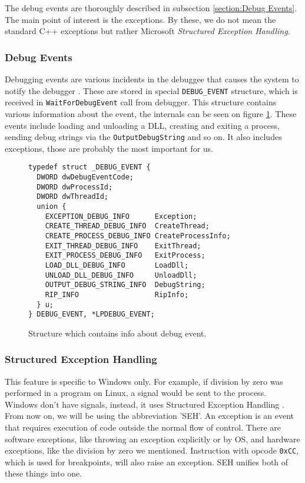 The debug events are thoroughly described in subsection \ref{section:Debug Events}. The main point of interest is the exceptions.
By these, we do not mean the standard C++ exceptions but rather Microsoft \textit{Structured Exception Handling}.

\subsubsection*{Debug Events}\label{section:Debug Events}
Debugging events are various incidents in the debuggee that causes the system to notify the debugger \cite{windows-msdn-debug-events}. These are stored in special \texttt{DEBUG_EVENT} structure, which is received in \texttt{WaitForDebugEvent} call from debugger. This structure contains various information about the event, the internals can be seen on figure \ref{fig:DebugEvent}. These events include loading and unloading a DLL, creating and exiting a process, sending debug strings via the \texttt{OutputDebugString} and so on. It also includes exceptions, those are probably the most important for us. 
\begin{figure}
\begin{verbatim}
typedef struct _DEBUG_EVENT {
  DWORD dwDebugEventCode;
  DWORD dwProcessId;
  DWORD dwThreadId;
  union {
    EXCEPTION_DEBUG_INFO      Exception;
    CREATE_THREAD_DEBUG_INFO  CreateThread;
    CREATE_PROCESS_DEBUG_INFO CreateProcessInfo;
    EXIT_THREAD_DEBUG_INFO    ExitThread;
    EXIT_PROCESS_DEBUG_INFO   ExitProcess;
    LOAD_DLL_DEBUG_INFO       LoadDll;
    UNLOAD_DLL_DEBUG_INFO     UnloadDll;
    OUTPUT_DEBUG_STRING_INFO  DebugString;
    RIP_INFO                  RipInfo;
  } u;
} DEBUG_EVENT, *LPDEBUG_EVENT;
\end{verbatim}
\caption{Structure which contains info about debug event.}
\label{fig:DebugEvent}
\end{figure}

\subsubsection*{Structured Exception Handling}
This feature is specific to Windows only. For example, if division by zero was performed in a program on Linux,
a signal would be sent to the process. Windows don't have signals, instead, it uses Structured Exception Handling \cite{windows-msdn-seh}. 
From now on, we will be using the abbreviation 'SEH'.
An exception is an event that requires execution of code outside the normal flow of control. There are software exceptions,
like throwing an exception explicitly or by OS, and hardware exceptions, like the division by zero we mentioned.
Instruction with opcode \texttt{0xCC}, which is used for breakpoints, will also raise an exception. SEH unifies both of these things into one.

